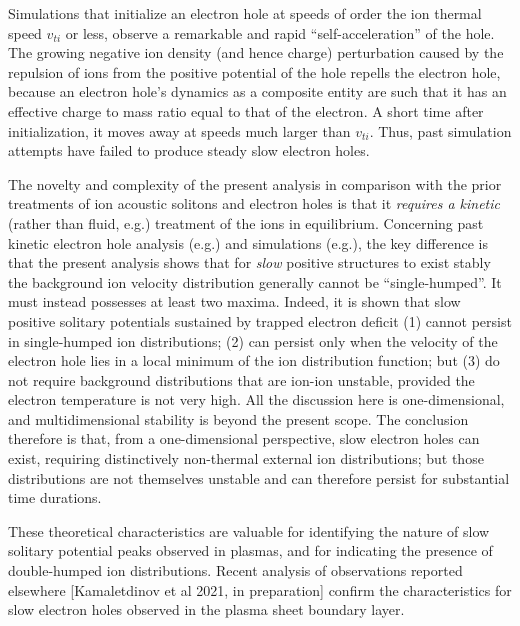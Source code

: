 \documentclass[12pt]{article}
\begin{document}
Simulations that initialize an electron hole at speeds of order the
ion thermal speed $v_{ti}$ or less, observe a remarkable and rapid
``self-acceleration'' of the
hole\cite{Saeki1991,Muschietti1999,Eliasson2004,Eliasson2006,Zhou2016}. The growing
negative ion density (and hence charge) perturbation caused by the
repulsion of ions from the positive potential of the hole repells the
electron hole, because an electron hole's dynamics as a composite
entity are such that it has an effective charge to mass ratio equal to
that of the electron\cite{Haakonsen2015,Hutchinson2016}. A short time
after initialization, it moves away at speeds much larger than
$v_{ti}$. Thus, past simulation attempts have failed to produce steady
slow electron holes.

The novelty and complexity of the present analysis in comparison with
the prior treatments of ion acoustic solitons and electron holes is
that it \emph{requires a kinetic} (rather than fluid, e.g.\cite{Kakad2016})
treatment of the ions in equilibrium. Concerning past kinetic electron
hole analysis (e.g.\cite{Dupree1982}) and simulations
(e.g.\cite{Eliasson2004}), the key difference is that the present
analysis shows that for \emph{slow} positive structures to exist
stably the background ion velocity distribution generally cannot be
``single-humped''. It must instead possesses at least two maxima.
Indeed, it is shown that slow positive solitary potentials sustained
by trapped electron deficit (1) cannot persist in single-humped ion
distributions; (2) can persist only when the velocity of the electron
hole lies in a local minimum of the ion distribution function; but (3)
do not require background distributions that are ion-ion unstable,
provided the electron temperature is not very high. All the discussion
here is one-dimensional, and multidimensional stability is beyond the
present scope. The conclusion therefore is that, from a
one-dimensional perspective, slow electron holes can exist, requiring
distinctively non-thermal external ion distributions; but those
distributions are not themselves unstable and can therefore persist
for substantial time durations.

These theoretical characteristics are valuable for identifying the
nature of slow solitary potential peaks observed in plasmas, and for
indicating the presence of double-humped ion distributions. Recent
analysis of observations reported elsewhere [Kamaletdinov et al 2021,
in preparation] confirm the characteristics for slow electron holes
observed in the plasma sheet boundary layer.
\end{document}
